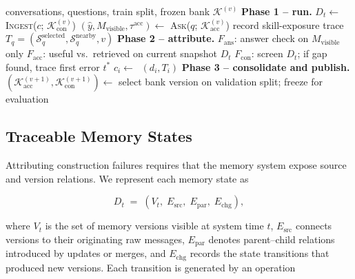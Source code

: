 \documentclass[11pt]{article}
\newcommand{\KK}{\mathcal{K}}
\DeclareMathOperator{\Cand}{G_{cand}}
\begin{document}
\begin{algorithm}[t]
\caption{Failure-driven skill learning (training phase)}
\label{alg:train}
\begin{algorithmic}[1]
\Require conversations, questions, train split, frozen bank $\KK^{(v)}$
\State \textbf{Phase 1 -- run.}
  \State $D_t \leftarrow$ \textsc{Ingest}($c$;\; $\KK_{\mathrm{con}}^{(v)}$) 
    \State $(\hat{y}, M_{\mathrm{visible}}, \tau^{\mathrm{acc}}) \leftarrow$ \textsc{Ask}($q$;\; $\KK_{\mathrm{acc}}^{(v)}$)
    \State record skill-exposure trace $T_q = (\mathcal{S}^{\mathrm{selected}}_q, \mathcal{S}^{\mathrm{nearby}}_q, v)$
  \EndFor
\EndFor
\State \textbf{Phase 2 -- attribute.}
  \State $F_{\mathrm{ans}}$: answer check on $M_{\mathrm{visible}}$ only
  \State $F_{\mathrm{acc}}$: useful vs.\ retrieved on current snapshot $D_t$
  \State $F_{\mathrm{con}}$: screen $D_t$; if gap found, trace first error $t^{*}$
    \State $c_i \leftarrow \Cand(d_i, T_i)$ 
  \EndFor
\EndFor
\State \textbf{Phase 3 -- consolidate and publish.}
\State $(\KK_{\mathrm{acc}}^{(v+1)}, \KK_{\mathrm{con}}^{(v+1)}) \leftarrow$ \Call{Consolidate}{candidates, $\KK^{(v)}$} 
\State select bank version on validation split; freeze for evaluation
\end{algorithmic}
\end{algorithm}

\subsection{Traceable Memory States}
\label{sec:method-states}

Attributing construction failures requires that the memory system expose source
and version relations. We represent each memory state as

\begin{equation}
\label{eq:state}
D_t \;=\; \left(V_t,\; E_{\mathrm{src}},\; E_{\mathrm{par}},\; E_{\mathrm{chg}}\right),
\end{equation}

\noindent where $V_t$ is the set of memory versions visible at system time $t$,
$E_{\mathrm{src}}$ connects versions to their originating raw messages,
$E_{\mathrm{par}}$ denotes parent--child relations introduced by updates or
merges, and $E_{\mathrm{chg}}$ records the state transitions that produced new
versions. Each transition is generated by an operation
\end{document}
